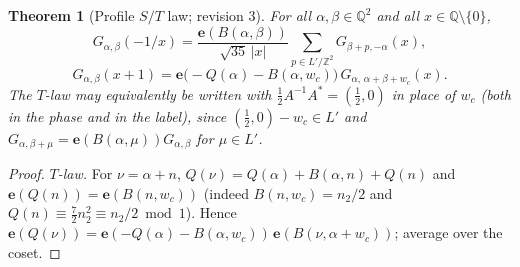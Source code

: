 \documentclass[11pt]{article}
\newtheorem{theorem}{Theorem}[section]
\theoremstyle{definition}
\newcommand{\Q}{\mathbb{Q}}
\newcommand{\Z}{\mathbb{Z}}
\newcommand{\e}{\mathbf{e}}
\begin{document}
\begin{theorem}[Profile $S/T$ law; revision 3]\label{thm:profile}
For all $\alpha,\beta\in\Q^2$ and all $x\in\Q\setminus\{0\}$,
\[
G_{\alpha,\beta}(-1/x)=\frac{\e(B(\alpha,\beta))}{\sqrt{35}\,|x|}\sum_{p\in L'/\Z^2}G_{\beta+p,-\alpha}(x),
\]
\[
G_{\alpha,\beta}(x+1)=\e\bigl(-Q(\alpha)-B(\alpha,w_c)\bigr)\,G_{\alpha,\,\alpha+\beta+w_c}(x).
\]
The $T$-law may equivalently be written with $\tfrac12A^{-1}A^*=(\tfrac12,0)$ in place of $w_c$ (both in the phase and in the label), since
$(\tfrac12,0)-w_c\in L'$ and $G_{\alpha,\beta+\mu}=\e(B(\alpha,\mu))G_{\alpha,\beta}$ for $\mu\in L'$.
\end{theorem}
\begin{proof}
\emph{$T$-law.} For $\nu=\alpha+n$, $Q(\nu)=Q(\alpha)+B(\alpha,n)+Q(n)$ and $\e(Q(n))=\e(B(n,w_c))$ (indeed $B(n,w_c)=n_2/2$ and
$Q(n)\equiv\tfrac72n_2^2\equiv n_2/2\bmod1$). Hence $\e(Q(\nu))=\e(-Q(\alpha)-B(\alpha,w_c))\,\e(B(\nu,\alpha+w_c))$; average over the coset.


\end{proof}
\end{document}

